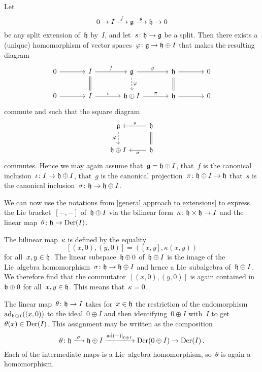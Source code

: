 \begin{example}
  Let
  \[
    0
    \to
    I
    \xlongto{f}
    \glie
    \xlongto{g}
    \hlie
    \to
    0
  \]
  be any split extension of~$\mathfrak{h}$ by~$I$, and let~$s \colon \mathfrak{h} \to \mathfrak{g}$ be a split.
  Then there exists a (unique) homomorphism of vector spaces~$\varphi \colon \mathfrak{g} \to \mathfrak{h} \oplus I$ that makes the resulting diagram
  \[
    \begin{tikzcd}[column sep = large]
      0
      \arrow{r}
      &
      I
      \arrow{r}[above]{f}
      \arrow[equal]{d}
      &
      \glie
      \arrow{r}[above]{g}
      \arrow[dashed]{d}[right]{\varphi}
      &
      \hlie
      \arrow{r}
      \arrow[equal]{d}
      &
      0
      \\
      0
      \arrow{r}
      &
      I
      \arrow{r}[above]{\iota}
      &
      \hlie \oplus I
      \arrow{r}[above]{\pi}
      &
      \hlie
      \arrow{r}
      &
      0
    \end{tikzcd}
  \]
  commute and such that the square diagram
  \[
    \begin{tikzcd}
      \glie
      \arrow[dashed]{d}[left]{\varphi}
      &
      \hlie
      \arrow{l}[above]{s}
      \arrow[equal]{d}
      \\
      \hlie \oplus I
      &
      \hlie
      \arrow{l}{\sigma}
    \end{tikzcd}
  \]
  commutes.
  Hence we may again assume that~$\mathfrak{g} = \mathfrak{h} \oplus I$, that~$f$ is the canonical inclusion~$\iota \colon I \to \mathfrak{h} \oplus I$, that~$g$ is the canonical projection~$\pi \colon \mathfrak{h} \oplus I \to \mathfrak{h}$ that~$s$ is the canonical inclusion~$\sigma \colon \mathfrak{h} \to \mathfrak{h} \oplus I$.
  
  We can now use the notations from \cref{general approach to extensions} to express the Lie bracket~$[-,-]$ of~$\mathfrak{h} \oplus I$ via the bilinear form~$\kappa \colon \mathfrak{h} \times \mathfrak{h} \to I$ and the linear map~$\theta \colon \mathfrak{h} \to \operatorname{Der}(I)$.
  
  The bilinear map~$\kappa$ is defined by the equality
  \[
    [(x,0), (y,0)]
    =
    ([x,y], \kappa(x,y))
  \]
  for all~$x, y \in \mathfrak{h}$.
  The linear subspace~$\mathfrak{h} \oplus 0$ of~$\mathfrak{h} \oplus I$ is the image of the Lie~algebra homomorphism~$\sigma \colon \mathfrak{h} \to \mathfrak{h} \oplus I$ and hence a Lie~subalgebra of~$\mathfrak{h} \oplus I$.
  We therefore find that the commutator~$[(x,0), (y,0)]$ is again contained in~$\mathfrak{h} \oplus 0$ for all~$x, y \in \mathfrak{h}$.
  This means that~$\kappa = 0$.
  
  The linear map~$\theta \colon \mathfrak{h} \to I$ takes for~$x \in \mathfrak{h}$ the restriction of the endomorphism~$\operatorname{ad}_{\mathfrak{h} \oplus I}((x,0))$ to the ideal~$0 \oplus I$ and then identifying~$0 \oplus I$ with~$I$ to get~$\theta(x) \in \operatorname{Der}(I)$.
  This assignment may be written as the composition
  \[
    \theta
    \colon
    \hlie
    \xlongto{\sigma}
    \hlie \oplus I
    \xlongto{ \restrict{\ad(-)}{0 \oplus I} }
    \Der(0 \oplus I)
    \to
    \Der(I) \,.
  \]
  Each of the intermediate maps is a Lie~algebra homomorphism, so~$\theta$ is again a homomorphism.
  

\end{example}
